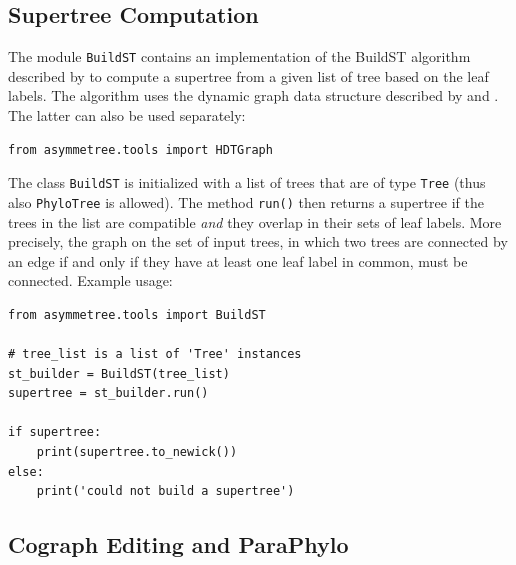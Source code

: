 \documentclass[hidelinks,11pt]{article}
\begin{document}
\subsection{Supertree Computation}

The module \texttt{BuildST} contains an implementation of the BuildST algorithm described by \citet{deng2016} to compute a supertree from a given list of tree based on the leaf labels.
The algorithm uses the dynamic graph data structure described by \citet{henzinger1995} and \citet{holm2001}.
The latter can also be used separately:

\begin{adjustwidth}{1cm}{1cm}\vspace{2mm}
\begin{verbatim}
from asymmetree.tools import HDTGraph
\end{verbatim}
\end{adjustwidth}

The class \texttt{BuildST} is initialized with a list of trees that are of type \texttt{Tree} (thus also \texttt{PhyloTree} is allowed).
The method \texttt{run()} then returns a supertree if the trees in the list are compatible \emph{and} they overlap in their sets of leaf labels.
More precisely, the graph on the set of input trees, in which two trees are connected by an edge if and only if they have at least one leaf label in common, must be connected.
Example usage:

\begin{adjustwidth}{1cm}{1cm}\vspace{2mm}
\begin{verbatim}
from asymmetree.tools import BuildST

# tree_list is a list of 'Tree' instances
st_builder = BuildST(tree_list)
supertree = st_builder.run()

if supertree:
    print(supertree.to_newick())
else:
    print('could not build a supertree')
\end{verbatim}
\end{adjustwidth}



\subsection{Cograph Editing and ParaPhylo}
\end{document}
